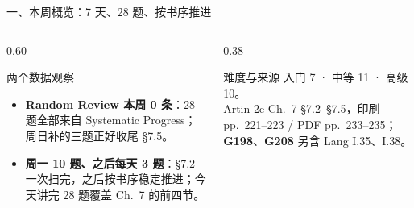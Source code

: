 \documentclass[aspectratio=169,10pt,fontset=none]{ctexbeamer}
\newcommand{\ex}[1]{\textcolor{accent}{\footnotesize\bfseries #1}}
\begin{document}
\begin{frame}[t]{一、本周概览：7 天、28 题、按书序推进}
\begin{columns}[T,onlytextwidth]
\begin{column}{0.60\textwidth}
      \raggedright
      \begin{exampleblock}{\footnotesize 两个数据观察}
        \scriptsize
        \begin{itemize}\setlength{\itemsep}{1pt}
          \item \textbf{Random Review 本周 0 条}：28 题全部来自 Systematic Progress；周日补的三题正好收尾 \S7.5。
          \item \textbf{周一 10 题、之后每天 3 题}：\S7.2 一次扫完，之后按书序稳定推进；今天讲完 28 题覆盖 Ch.~7 的前四节。
        \end{itemize}
      \end{exampleblock}
    \end{column}
    \begin{column}{0.38\textwidth}
      \centering

      \vspace{0.2em}
      \begin{block}{\footnotesize 难度与来源}
        \scriptsize
        入门 7 · 中等 11 · 高级 10。\\[1pt]
        Artin 2e Ch.~7 \S7.2--\S7.5，印刷 pp.~221--223 / PDF pp.~233--235；\ex{G198}、\ex{G208} 另含 Lang I.35、I.38。
      \end{block}
    \end{column}
  \end{columns}
\end{frame}
\end{document}
